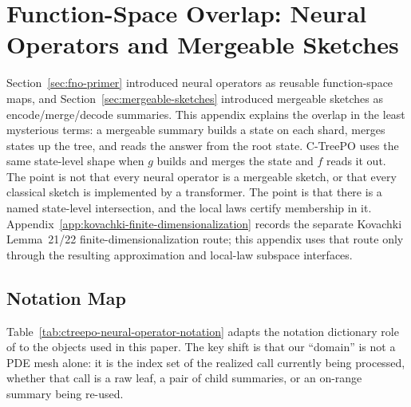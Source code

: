 \section{Function-Space Overlap: Neural Operators and Mergeable Sketches}\label{app:operator-overlap}

Section~\ref{sec:fno-primer} introduced neural operators as reusable
function-space maps, and Section~\ref{sec:mergeable-sketches} introduced
mergeable sketches as encode/merge/decode summaries. This appendix explains
the overlap in the least mysterious terms: a mergeable summary builds a state
on each shard, merges states up the tree, and reads the answer from the root
state. C-TreePO uses the same state-level shape when $g$ builds and merges the
state and $f$ reads it out. The point is not that every neural operator is a
mergeable sketch, or that every classical sketch is implemented by a
transformer. The point is that there is a named state-level intersection, and
the local laws certify membership in it.
Appendix~\ref{app:kovachki-finite-dimensionalization} records the
separate Kovachki Lemma~21/22 finite-dimensionalization route; this
appendix uses that route only through the resulting approximation and
local-law subspace interfaces.

\subsection{Notation Map}

Table~\ref{tab:ctreepo-neural-operator-notation} adapts the notation
dictionary role of \citet[Table~10]{Kovachki23NeuralOperator} to the
objects used in this paper. The key shift is that our ``domain'' is not a
PDE mesh alone: it is the index set of the realized call currently being
processed, whether that call is a raw leaf, a pair of child summaries, or
an on-range summary being re-used.

